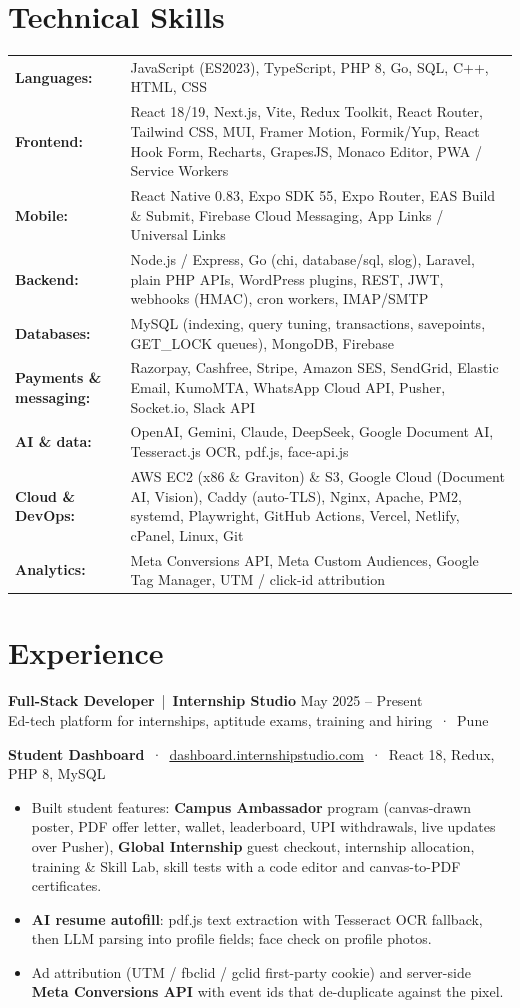 \documentclass[10pt,a4paper]{article}
\newcommand{\link}[2]{\href{#1}{\color{teal}#2}}
\newcommand{\job}[4]{%
  \textbf{\large #1} \,|\, \textbf{\color{teal}#2} \hfill {\small\color{muted}#3}\\[-1pt]
  {\small\color{muted}#4}\vspace{1pt}}
\newcommand{\skill}[2]{\textbf{#1:} & #2 \\}
\begin{document}
\section{Technical Skills}
{\small
\begin{tabularx}{\linewidth}{@{}p{3.3cm}X@{}}
\skill{Languages}{JavaScript (ES2023), TypeScript, PHP 8, Go, SQL, C++, HTML, CSS}
\skill{Frontend}{React 18/19, Next.js, Vite, Redux Toolkit, React Router, Tailwind CSS, MUI, Framer Motion, Formik/Yup, React Hook Form, Recharts, GrapesJS, Monaco Editor, PWA / Service Workers}
\skill{Mobile}{React Native 0.83, Expo SDK 55, Expo Router, EAS Build \& Submit, Firebase Cloud Messaging, App Links / Universal Links}
\skill{Backend}{Node.js / Express, Go (chi, database/sql, slog), Laravel, plain PHP APIs, WordPress plugins, REST, JWT, webhooks (HMAC), cron workers, IMAP/SMTP}
\skill{Databases}{MySQL (indexing, query tuning, transactions, savepoints, GET\_LOCK queues), MongoDB, Firebase}
\skill{Payments \& messaging}{Razorpay, Cashfree, Stripe, Amazon SES, SendGrid, Elastic Email, KumoMTA, WhatsApp Cloud API, Pusher, Socket.io, Slack API}
\skill{AI \& data}{OpenAI, Gemini, Claude, DeepSeek, Google Document AI, Tesseract.js OCR, pdf.js, face-api.js}
\skill{Cloud \& DevOps}{AWS EC2 (x86 \& Graviton) \& S3, Google Cloud (Document AI, Vision), Caddy (auto-TLS), Nginx, Apache, PM2, systemd, Playwright, GitHub Actions, Vercel, Netlify, cPanel, Linux, Git}
\skill{Analytics}{Meta Conversions API, Meta Custom Audiences, Google Tag Manager, UTM / click-id attribution}
\end{tabularx}}

\section{Experience}

\job{Full-Stack Developer}{Internship Studio}{May 2025 -- Present}{Ed-tech platform for internships, aptitude exams, training and hiring \,·\, Pune}

\textbf{Student Dashboard} \,·\, \link{https://dashboard.internshipstudio.com}{dashboard.internshipstudio.com} \,·\, {\small React 18, Redux, PHP 8, MySQL}
\begin{itemize}
  \item Built student features: \textbf{Campus Ambassador} program (canvas-drawn poster, PDF offer letter, wallet, leaderboard, UPI withdrawals, live updates over Pusher),
        \textbf{Global Internship} guest checkout, internship allocation, training \& Skill Lab, skill tests with a code editor and canvas-to-PDF certificates.
  \item \textbf{AI resume autofill}: pdf.js text extraction with Tesseract OCR fallback, then LLM parsing into profile fields; face check on profile photos.
  \item Ad attribution (UTM / fbclid / gclid first-party cookie) and server-side \textbf{Meta Conversions API} with event ids that de-duplicate against the pixel.
\end{itemize}
\end{document}
